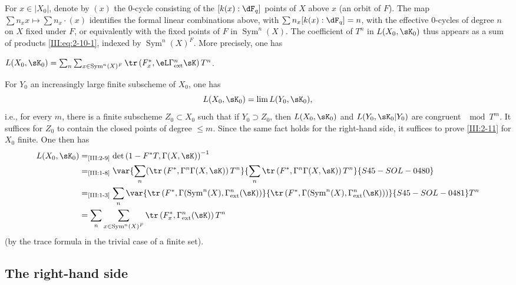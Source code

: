 For $x\in |X_0|$, denote by $(x)$ the $0$-cycle consisting of the
$[k(x):\dF_q]$ points of $X$ above $x$ (an orbit of $F$). The map
$\sum n_x x\mapsto \sum n_x\cdot (x)$ identifies the formal linear combinations
above, with $\sum n_x [k(x):\dF_q]=n$, with the effective $0$-cycles of degree
$n$ on $X$ fixed under $F$, or equivalently with the fixed points of $F$ in
$\operatorname{Sym}^n(X)$. The coefficient of $T^n$ in $L(X_0,\sK_0)$ thus
appears as a sum of products \eqref{III:eq:2-10-1}, indexed by
$\operatorname{Sym}^n(X)^F$. More precisely, one has





\begin{lemma_}\label{III:2-11}
 $L(X_0,\sK_0) = \sum_n \sum_{x\in\operatorname{Sym}^n(X)^F} \tr\left(F_x^*,\eL\Gamma_\textnormal{ext}^n \sK\right) T^n$.
\end{lemma_}

For $Y_0$ an increasingly large finite subscheme of $X_0$, one has
\[
  L(X_0,\sK_0) = \lim L(Y_0,\sK_0) \text{,}
\]
i.e., for every $m$, there is a finite subscheme $Z_0\subset X_0$ such that
if $Y_0\supset Z_0$, then $L(X_0,\sK_0)$ and $L(Y_0,\sK_0|Y_0)$ are congruent
$\mod T^m$.
It suffices for $Z_0$ to contain the closed points of degree $\leqslant m$.
Since the same fact holds for the right-hand side, it suffices to prove
\ref{III:2-11} for $X_0$ finite. One then has
\begin{align*}
  L(X_0,\sK_0)
    &=_\text{\ref{III:2-9}} \det\left(1-F^* T,\Gamma(X,\sK)\right)^{-1} \\
    &=_\text{\ref{III:1-8}} \var{\sum_n (\tr\left(F^*,\Gamma^n \Gamma(X,\sK)\right) T^n}{\sum_n \tr\left(F^*,\Gamma^n \Gamma(X,\sK)\right) T^n}{S45-SOL-0480} \\
    &=_\text{\ref{III:1-3}} \sum_n \var{\tr\left(F^*,\Gamma(\operatorname{Sym}^n(X),\Gamma_\text{ext}^n(\sK)\right)}{\tr\left(F^*,\Gamma(\operatorname{Sym}^n(X),\Gamma_\text{ext}^n(\sK))\right)}{S45-SOL-0481} T^n \\
    &= \sum_n \sum_{x\in \operatorname{Sym}^n(X)^F} \tr\left(F_x^*,\Gamma_\text{ext}^n(\sK)\right) T^n
\end{align*}
(by the trace formula in the trivial case of a finite set).






\subsection{The right-hand side}\label{III:2-12}

